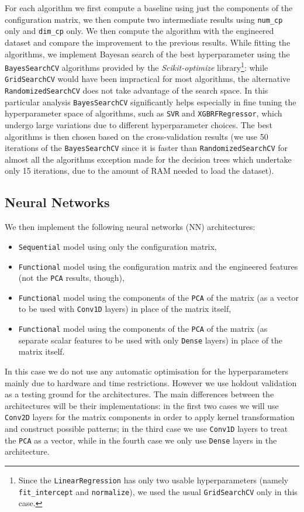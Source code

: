     For each algorithm we first compute a baseline using just the components of the configuration matrix, we then compute two intermediate results using \texttt{num\_cp} only and \texttt{dim\_cp} only. We then compute the algorithm with the engineered dataset and compare the improvement to the previous results. While fitting the algorithms, we implement Bayesan search of the best hyperparameter using the \texttt{BayesSearchCV} algorithms provided by the \textit{Scikit-optimize} library\footnote{Since the \texttt{LinearRegression} has only two usable hyperparameters (namely \texttt{fit\_intercept} and \texttt{normalize}), we used the usual \texttt{GridSearchCV} only in this case.}: while \texttt{GridSearchCV} would have been impractical for most algorithms, the alternative \texttt{RandomizedSearchCV} does not take advantage of the search space. In this particular analysis \texttt{BayesSearchCV} significantly helps especially in fine tuning the hyperparameter space of algorithms, such as \texttt{SVR} and \texttt{XGBRFRegressor}, which undergo large variations due to different hyperparameter choices. The best algorithms is then chosen based on the cross-validation results (we use 50 iterations of the \texttt{BayesSearchCV} since it is faster than \texttt{RandomizedSearchCV} for almost all the algorithms exception made for the decision trees which undertake only 15 iterations, due to the amount of RAM needed to load the dataset).

\subsection{Neural Networks}
    We then implement the following neural networks (NN) architectures:
    \begin{itemize}
        \item \texttt{Sequential} model using only the configuration matrix,
        \item \texttt{Functional} model using the configuration matrix and the engineered features (not the \texttt{PCA} results, though),
        \item \texttt{Functional} model using the components of the \texttt{PCA} of the matrix (as a vector to be used with \texttt{Conv1D} layers) in place of the matrix itself,
        \item \texttt{Functional} model using the components of the \texttt{PCA} of the matrix (as separate scalar features to be used with only \texttt{Dense} layers) in place of the matrix itself.
    \end{itemize}
    In this case we do not use any automatic optimisation for the hyperparameters mainly due to hardware and time restrictions. However we use holdout validation as a testing ground for the architectures. The main differences between the architectures will be their implementations: in the first two cases we will use \texttt{Conv2D} layers for the matrix components in order to apply kernel transformation and construct possible patterns; in the third case we use \texttt{Conv1D} layers to treat the \texttt{PCA} as a vector, while in the fourth case we only use \texttt{Dense} layers in the architecture.
    
